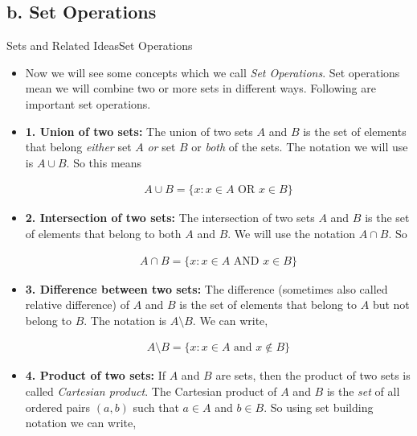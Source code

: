 \documentclass[8pt,usepdftitle=false]{beamer}
\begin{document}
\subsection{b. Set Operations}
\frame{\subsectionpage}
\begin{frame}[allowframebreaks]{Sets and Related Ideas}{Set Operations}

\begin{itemize}



\item Now we will see some concepts which we call \emph{Set Operations}. Set operations mean we will combine two or more sets in different ways. Following are important set operations.
    
\item \textbf{1. Union of two sets:} The union of two sets $A$ and $B$ is the set of elements that belong \emph{either} set $A$ \emph{or} set $B$ or \emph{both} of the sets. The notation we will use is $A \cup B$. So this means




\begin{align*}
A \cup B=\{ x: x \in A \text { OR } x \in B\}
\end{align*}


\item \textbf{2. Intersection of two sets:} The intersection of two sets $A$ and $B$ is the set of elements that belong to \alert{both} $A$ and $B$. We will use the notation $A \cap B$. So


\begin{align*}
A \cap B=\{x: x \in A \text { AND } x \in B\}
\end{align*}


\item \textbf{3. Difference between two sets:} The difference (sometimes also called relative difference) of $A$ and $B$ is the set of elements that \alert{belong to} $A$ but \alert{not belong to} $B$. The notation is $A \setminus B$. We can write,



\begin{align*}
A \setminus B=\{x: x \in A \text { and } x \notin B\}
\end{align*}



\item \textbf{4. Product of two sets:} If $A$ and $B$ are sets, then the product of two sets is called \emph{Cartesian product}. The \alert{Cartesian product} of $A$ and $B$ is the \emph{set} of all \alert{ordered pairs} $(a, b)$ such that $a \in A$ and $b \in B$. So using set building notation we can write,



\end{itemize}
\end{frame}
\end{document}
